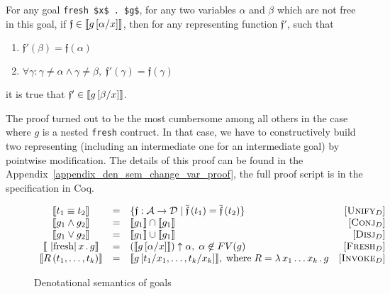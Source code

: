 \begin{lemma}
\label{lem:den_sem_change_var}
For any goal \lstinline|fresh $x$ . $g$|, for any two variables $\alpha$ and $\beta$ which are not free in this goal,
if $\mathfrak{f} \in \llbracket{g\,[\alpha/x]}\rrbracket$, then for any representing function $\mathfrak{f}'$, such that

\begin{enumerate}
\item $\mathfrak{f}'(\beta) = \mathfrak{f}(\alpha)$
\item $\forall \gamma: \gamma \neq \alpha \land \gamma \neq \beta,\; \mathfrak{f}'(\gamma) = \mathfrak{f}(\gamma)$
\end{enumerate}

\noindent it is true that $\mathfrak{f}' \in \llbracket{g\,[\beta/x]}\rrbracket$.
\end{lemma}
  The proof turned out to be the most cumbersome among all others in the case where $g$ is a nested \lstinline|fresh| contruct. In that case, we have to constructively build two representing (including an intermediate one for an intermediate goal) by pointwise modification. The details of this proof can be found in the Appendix~\ref{appendix_den_sem_change_var_proof}, the full proof script is in the specification in Coq.

\begin{figure}[t]
  \[
  \begin{array}{cclr}
    \sembr{t_1\equiv t_2}&=&\{\mathfrak f : \mathcal{A}\to\mathcal{D}\mid \overline{\mathfrak{f}}\,(t_1)=\overline{\mathfrak{f}}\,(t_2)\}& \ruleno{Unify$_D$}\\
    \sembr{g_1\wedge g_2}&=&\sembr{g_1}\cap\sembr{g_1}&\ruleno{Conj$_D$}\\
    \sembr{g_1\vee g_2}&=&\sembr{g_1}\cup\sembr{g_1}&\ruleno{Disj$_D$}\\
    \sembr{\mbox{\lstinline|fresh|}\,x\,.\,g}&=&(\sembr{g\,[\alpha/x]})\uparrow\alpha,\;\alpha\not\in FV(g)& \ruleno{Fresh$_D$}\\
    \sembr{R\,(t_1,\dots,t_k)}&=&\sembr{g\,[t_1/x_1,\dots,t_k/x_k]},\;\mbox{where}\;R=\lambda\,x_1\dots x_k\,.\,g & \ruleno{Invoke$_D$}
  \end{array}
  \]
  \caption{Denotational semantics of goals}
  \label{denotational_semantics_of_goals}
\end{figure}

